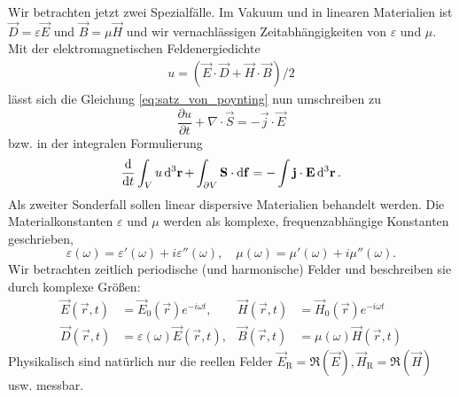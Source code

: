 Wir betrachten jetzt zwei Spezialfälle. Im Vakuum und in linearen Materialien ist $\vec {D}=\varepsilon \vec {E}$ und $\vec {B}=\mu \vec {H}$ und wir vernachlässigen Zeitabhängigkeiten von $\varepsilon $ und $\mu $. Mit der elektromagnetischen Feldenergiedichte
\begin{align}
	\label{eq:energiedichte}
	u=\left(\vec {E}\cdot \vec {D}+\vec {H}\cdot \vec {B}\right)/2
\end{align}
lässt sich die Gleichung \eqref{eq:satz_von_poynting} nun umschreiben zu
\begin{equation*}
	\frac{\partial u}{\partial t}+\nabla \cdot \vec {S}=-\vec {j}\cdot \vec {E}
\end{equation*}
bzw. in der integralen Formulierung
\begin{equation*}
	\frac{\diff }{\diff t}\int _{V}u\diffa[3]{\vec{r}}+\int _{\partial V}\vec {S}\cdot \diff \vec {f}=-\int \vec {j}\cdot \vec {E}\diffa[3]{\vec{r}}.
\end{equation*}
Als zweiter Sonderfall sollen linear dispersive Materialien behandelt werden. Die Materialkonstanten $\varepsilon $ und $\mu $ werden als komplexe, frequenzabhängige Konstanten geschrieben,
\begin{equation*}
	\varepsilon \left(\omega \right)=\varepsilon '\left(\omega \right)+i\varepsilon ''\left(\omega \right),\quad \mu \left(\omega \right)=\mu '\left(\omega \right)+i\mu ''\left(\omega \right).
\end{equation*}
Wir betrachten zeitlich periodische (und harmonische) Felder und beschreiben sie durch komplexe Größen:
\begin{align*}
	\vec {E}\left(\vec {r},t\right) & =\vec {E}_{0}\left(\vec {r}\right)e^{-i\omega t},                 & \vec {H}\left(\vec {r},t\right) & =\vec {H}_{0}\left(\vec {r}\right)e^{-i\omega t}         \\
	\vec {D}\left(\vec {r},t\right) & =\varepsilon \left(\omega \right)\vec {E}\left(\vec {r},t\right), & \vec {B}\left(\vec {r},t\right) & =\mu \left(\omega \right)\vec {H}\left(\vec {r},t\right)
\end{align*}
Physikalisch sind natürlich nur die reellen Felder $\vec {E}_{\mathrm{R}}=\mathfrak{R}\left(\vec {E}\right), \vec {H}_{\mathrm{R}}=\mathfrak{R}\left(\vec {H}\right)$ usw. messbar.

